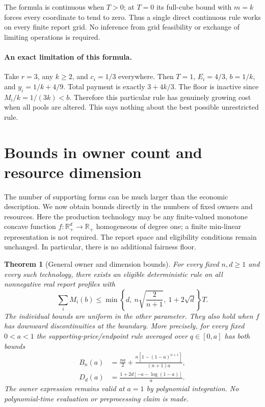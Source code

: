 \documentclass[11pt]{article}
\newtheorem{theorem}{Theorem}[section]
\theoremstyle{definition}\newtheorem{definition}[theorem]{Definition}
\theoremstyle{remark}\newtheorem{remark}[theorem]{Remark}
\newcommand{\R}{\mathbb R}
\begin{document}
The formula is continuous when $T>0$; at $T=0$ its full-cube bound with
$m=k$ forces every coordinate to tend to zero. Thus a single direct
continuous rule works on every finite report grid. No inference from grid
feasibility or exchange of limiting operations is required.

\paragraph{An exact limitation of this formula.}
Take $r=3$, any $k\ge2$, and $c_i=1/3$ everywhere. Then $T=1$, $E_i=4/3$,
$b=1/k$, and $y_i=1/k+4/9$. Total payment is exactly $3+4k/3$.
The floor is inactive since $M_i/k=1/(3k)<b$. Therefore this particular
rule has genuinely growing cost when all pools are altered. This says nothing
about the best possible unrestricted rule.


\section{Bounds in owner count and resource dimension}\label{general:section}
The number of supporting forms can be much larger than the economic description.
We now obtain bounds directly in the numbers of fixed owners and resources.
Here the production technology may be any finite-valued monotone concave
function $f:\R_+^d\to\R_+$ homogeneous of degree one; a finite min-linear
representation is not required. The report space and eligibility conditions
remain unchanged. In particular, there is no additional fairness floor.

\begin{theorem}[General owner and dimension bounds]\label{general:sqrt}
For every fixed $n,d\ge1$ and every such technology, there exists an eligible
deterministic rule on all nonnegative real report profiles with
\begin{equation}\label{general:combined}
 \sum_i M_i(b)\le
 \min\left\{d,\ n\sqrt{\frac{2}{n+1}},\ 1+2\sqrt d\right\}T.
\end{equation}
The individual bounds are uniform in the other parameter. They also hold when
$f$ has downward discontinuities at the boundary. More precisely, for every
fixed $0<a<1$ the supporting-price/endpoint rule averaged over $q\in[0,a]$
has both bounds
\begin{align}
 B_n(a)&=\frac{na}{2}+
 \frac{n[1-(1-a)^{n+1}]}{(n+1)a},\label{general:owner}\\
 D_d(a)&=\frac{1+2d[-a-\log(1-a)]}{a}.\label{general:dimension}
\end{align}
The owner expression remains valid at $a=1$ by polynomial integration.
No polynomial-time evaluation or preprocessing claim is made.
\end{theorem}
\end{document}
